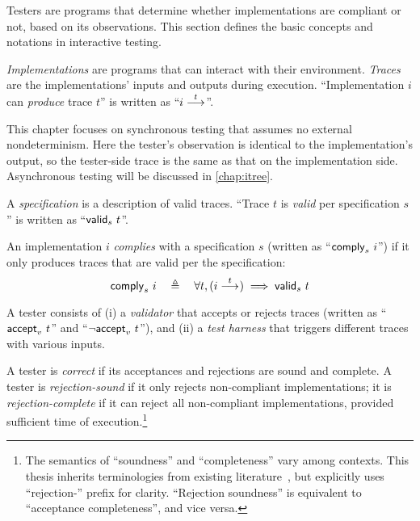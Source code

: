 Testers are programs that determine whether implementations are compliant or
not, based on its observations.  This section defines the basic concepts and
notations in interactive testing.

\begin{definition}
  {\em Implementations} are programs that can interact with their environment.
  {\em Traces} are the implementations' inputs and outputs during execution.
  ``Implementation $i$ can {\em produce} trace $t$'' is written as ``$i\overset{t}\longrightarrow_{}$''.
\end{definition}

This chapter focuses on synchronous testing that assumes no external
nondeterminism.  Here the tester's observation is identical to the
implementation's output, so the tester-side trace is the same as that on the
implementation side.  Asynchronous testing will be discussed in
\autoref{chap:itree}.

\begin{definition}
  \label{def:compliance}
  A {\em specification} is a description of valid traces.  ``Trace $t$ is {\em
    valid} per specification $s$'' is written as ``$\mathsf{valid}_{s}~{t}$''.

  An implementation $i$ {\em complies} with a specification $s$ (written as
  ``$\mathsf{comply}_{s}~{i}$'') if it only produces traces that are valid per the
  specification:
  \[\mathsf{comply}_{s}~{i}\quad\triangleq\quad\forall t,(i\overset{t}\longrightarrow_{})\implies\mathsf{valid}_{s}~{t}\]
\end{definition}

\begin{definition}
  \label{def:tester}
  A tester consists of (i) a {\em validator} that accepts or rejects
  traces (written as ``$\mathsf{accept}_{v}~{t}$'' and ``$\neg\mathsf{accept}_{v}~{t}$''), and
  (ii) a {\em test harness} that triggers different traces with
  various inputs.

  A tester is {\em correct} if its acceptances and rejections are sound and
  complete.  A tester is {\em rejection-sound} if it only rejects non-compliant
  implementations; it is {\em rejection-complete} if it can reject all
  non-compliant implementations, provided sufficient time of
  execution.\footnote{The semantics of ``soundness'' and ``completeness'' vary
    among contexts.  This thesis inherits terminologies from existing
    literature~\cite{Tretmans}, but explicitly uses ``rejection-'' prefix for
    clarity.  ``Rejection soundness'' is equivalent to ``acceptance
    completeness'', and vice versa.}
\end{definition}

